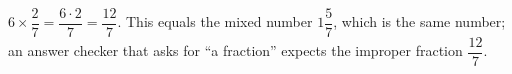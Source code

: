 $6\times\dfrac{2}{7}=\dfrac{6\cdot2}{7}=\boxed{\dfrac{12}{7}}$. This equals the mixed number $1\dfrac{5}{7}$, which is the same number; an answer checker that asks for ``a fraction'' expects the improper fraction $\dfrac{12}{7}$.
